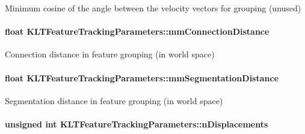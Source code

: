 Minimum cosine of the angle between the velocity vectors for grouping (unused) 

\hypertarget{structKLTFeatureTrackingParameters_a83a3fbc2ab0c369b8ccda3d1669ed988}{
\paragraph[{mm\-Connection\-Distance}]{\setlength{\rightskip}{0pt plus 5cm}float K\-L\-T\-Feature\-Tracking\-Parameters\-::mm\-Connection\-Distance}}\label{structKLTFeatureTrackingParameters_a83a3fbc2ab0c369b8ccda3d1669ed988}


Connection distance in feature grouping (in world space) 

\hypertarget{structKLTFeatureTrackingParameters_a2cf9367a2414ead952228bed67339e7c}{
\paragraph[{mm\-Segmentation\-Distance}]{\setlength{\rightskip}{0pt plus 5cm}float K\-L\-T\-Feature\-Tracking\-Parameters\-::mm\-Segmentation\-Distance}}\label{structKLTFeatureTrackingParameters_a2cf9367a2414ead952228bed67339e7c}


Segmentation distance in feature grouping (in world space) 

\hypertarget{structKLTFeatureTrackingParameters_a1b5dba549536ac01c2817a63c138b9a7}{
\paragraph[{n\-Displacements}]{\setlength{\rightskip}{0pt plus 5cm}unsigned int K\-L\-T\-Feature\-Tracking\-Parameters\-::n\-Displacements}}\label{structKLTFeatureTrackingParameters_a1b5dba549536ac01c2817a63c138b9a7}


